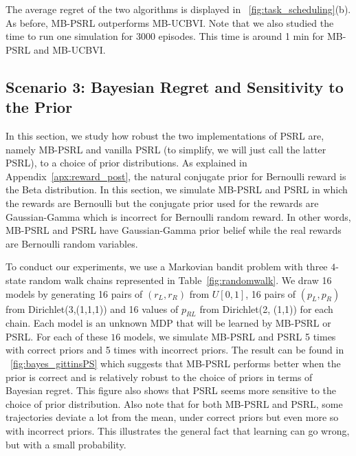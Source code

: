 \begin{subappendices}
The average regret of the two algorithms is displayed in \figurename~\ref{fig:task_scheduling}(b). As before, MB-PSRL outperforms MB-UCBVI.  Note that we also studied the time to run one simulation for 3000 episodes. This time is around 1 min for MB-PSRL and MB-UCBVI. 

\subsection{Scenario 3: Bayesian Regret and Sensitivity to the Prior}
\label{ssec:prior}

In this section, we study how robust the two implementations of PSRL are, namely MB-PSRL and vanilla PSRL (to simplify, we will just call the latter PSRL), to a choice of prior distributions. 
As explained in Appendix~\ref{apx:reward_post}, the natural conjugate prior for Bernoulli reward is the Beta distribution. 
In this section, we simulate MB-PSRL and PSRL in which the rewards are Bernoulli but the conjugate prior used for the rewards are Gaussian-Gamma which is incorrect for Bernoulli random reward. 
In other words, MB-PSRL and PSRL have Gaussian-Gamma prior belief while the real rewards are Bernoulli random variables. 


To conduct our experiments, we use a Markovian bandit problem with three $4$-state random walk chains represented in Table~\ref{fig:randomwalk}. 
We draw 16 models by generating 16 pairs of $(r_L, r_R)$ from $U[0,1]$, 16 pairs of $(p_L, p_R)$ from Dirichlet(3,(1,1,1)) and 16 values of $p_{RL}$ from Dirichlet(2, (1,1)) for each chain. 
Each model is an unknown MDP that will be learned by MB-PSRL or PSRL. 
For each of these $16$ models, we simulate MB-PSRL and PSRL 5 times with correct priors and 5 times with incorrect priors. 
The result can be found in \figurename~\ref{fig:bayes_gittinsPS} which suggests that MB-PSRL performs better when the prior is correct and is relatively robust to the choice of priors in terms of Bayesian regret. 
This figure also shows that PSRL seems more sensitive to the choice of prior distribution. 
Also note that for both MB-PSRL and PSRL, some trajectories deviate a lot from the mean, under correct priors but even more so with  incorrect priors. 
This illustrates the general fact that learning can go wrong, but with a small probability.


\end{subappendices}
